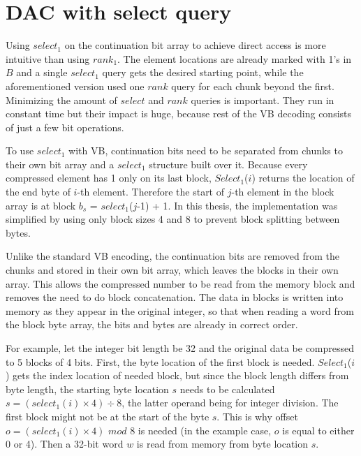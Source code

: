 \chapter{DAC with select query}
\label{chap:select_impl}
Using $select_1$ on the continuation bit array to achieve direct access is more intuitive than using $rank_1$. The element locations are already marked with 1's 
in $B$ and a single $select_1$ query gets the desired starting point, while the aforementioned version \citep{Bri09} used one $rank$ query for each chunk beyond 
the first. Minimizing the amount of $select$ and $rank$ queries is important. They run in constant time but their impact is huge, because rest of the VB decoding 
consists of just a few bit operations. 

To use $select_1$ with VB, continuation bits need to be separated from chunks to their own bit array and a $select_1$ structure built over it. Because every compressed element has 1
only on its last block, $Select_1$($i$) returns the location of the end byte of $i$-th element. Therefore the start of  $j$-th element in the block array is at 
block $b_s$ = $select_1$($j$-1) + 1. In this thesis, the implementation was simplified by using only block sizes 4 and 8 to prevent block splitting between bytes.

Unlike the standard VB encoding, the continuation bits are removed from the chunks and stored in their own bit array, which leaves the blocks in their own array. This allows the 
compressed number to be read from the memory block and removes the need to do block concatenation. The data in blocks is written into memory as they appear in the original integer, so that 
when reading a word from the block byte array, the bits and bytes are already in correct order. 

For example, let the integer bit length be 32 and the original data be compressed to 5 blocks of 4 bits. First, the byte location of the first block is needed. $Select_1$($i$) gets the index location
of needed block, but since the block length differs from byte length, the starting byte location $s$ needs to be calculated $s = (select_1(i) \times 4) \div 8$, the latter operand being for integer division.
The first block might not be at the start of the byte $s$. This is why offset $o = (select_1(i) \times 4)$ $mod$ $8$ is needed (in the example case, $o$ is equal to either 0 or 4). Then a 32-bit word $w$ is read from memory from byte location $s$. 

